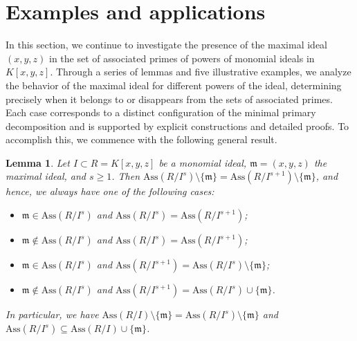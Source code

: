 \documentclass[11pt]{amsart}
\newtheorem{lemma}[theorem]{Lemma}
\begin{document}



 
 

\section{Examples and applications}\label{Section4}


 In this section, we continue to investigate the presence of the maximal ideal $(x,y,z)$ in the set of associated primes of powers of monomial ideals in $K[x,y,z]$. Through a series of lemmas and five illustrative examples, we analyze the behavior of the maximal ideal for different powers of the ideal, determining precisely when it belongs to or disappears from the sets of associated primes. Each case corresponds to a distinct configuration of the minimal primary decomposition and is supported by explicit constructions and detailed proofs. To accomplish this, we commence with the following general result.  




\begin{lemma} \label{Lem.Ass}
Let $I\subset R=K[x,y,z]$ be a monomial ideal, $\mathfrak{m}=(x,y,z)$ the maximal ideal, and $s\geq 1$. Then
  $\mathrm{Ass}(R/I^s)\setminus \{\mathfrak{m}\}=\mathrm{Ass}(R/I^{s+1})\setminus \{\mathfrak{m}\}$, and hence, we always have 
  one of the following cases:
\begin{itemize}
\item[(i)]  $\mathfrak{m} \in \mathrm{Ass}(R/I^s)$ and  $\mathrm{Ass}(R/I^s)=\mathrm{Ass}(R/I^{s+1})$;
\item[(ii)]   $\mathfrak{m} \notin \mathrm{Ass}(R/I^s)$ and  $\mathrm{Ass}(R/I^s)=\mathrm{Ass}(R/I^{s+1})$;
\item[(iii)]  $\mathfrak{m} \in \mathrm{Ass}(R/I^s)$ and  $\mathrm{Ass}(R/I^{s+1})=\mathrm{Ass}(R/I^s)\setminus \{\mathfrak{m}\}$;
\item[(iv)]  $\mathfrak{m} \notin \mathrm{Ass}(R/I^s)$ and  $\mathrm{Ass}(R/I^{s+1})=\mathrm{Ass}(R/I^s) \cup \{\mathfrak{m}\}$.
 \end{itemize}
 
 In particular, we have    $\mathrm{Ass}(R/I)\setminus \{\mathfrak{m}\}=\mathrm{Ass}(R/I^{s})\setminus \{\mathfrak{m}\}$
 and  $\mathrm{Ass}(R/I^s) \subseteq \mathrm{Ass}(R/I) \cup \{\mathfrak{m}\}$. 
\end{lemma}
\end{document}
